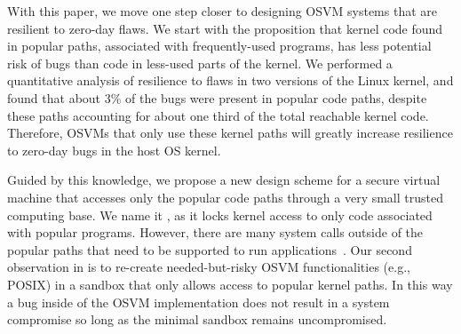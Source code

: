 
With this paper, we move one step closer to designing OSVM systems that are
resilient to zero-day flaws.   We start
 with the proposition that kernel code found in popular paths, associated with frequently-used programs,
has less potential risk of bugs than code in less-used parts of the kernel.
We performed a quantitative analysis of resilience
  to flaws in two versions of the Linux kernel, and
found that about 3\% of the bugs were present in popular code paths,
despite these paths accounting for about one third of the total reachable 
kernel code.  
Therefore, OSVMs that only use these kernel paths will 
greatly increase resilience to zero-day bugs in the host OS kernel.

Guided by this knowledge, we propose a new design scheme for a secure virtual machine that
accesses only the popular code paths through a very small trusted computing base.
We name it \lip, as it locks kernel access to only code
associated with popular programs. %
However, there are many system calls outside of the popular paths that need to 
be supported to run applications~\cite{tsai2016study}.  Our second
observation in \lip is to re-create needed-but-risky OSVM functionalities
(e.g., POSIX) in a 
sandbox that only allows access to popular kernel paths.  In this way a bug
inside of the OSVM implementation does not result in a system compromise
so long as the minimal sandbox remains uncompromised.

